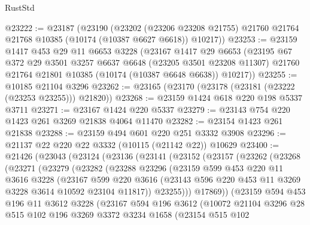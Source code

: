\begin{lexlean}{RustStd}
\begin{coremodule}
@23222 := @23187
    (@23190
      (@23202
        (@23206 @23208 @21755)
        @21760
        @21764
        @21768
        @10385
        (@10174 (@10387 @6627 @6618))
        @10217))
@23253 := @23159
    @1417
    @453
    @29
    @11
    @6653
    @3228
    (@23167
      @1417
      @29
      @6653
      (@23195
        @67
        @372
        @29
        @3501
        @3257
        @6637
        @6648
        (@23205 @3501 @23208 @11307)
        @21760
        @21764
        @21801
        @10385
        (@10174 (@10387 @6648 @6638))
        @10217))
@23255 := @10185 @21104 @3296
@23262 := @23165 (@23170 (@23178 (@23181 (@23222 (@23253 @23255))) @21820))
@23268 := @23159 @1424 @618 @220 @198 @5337 @3711
@23271 := @23167 @1424 @220 @5337
@23279 := @23143 @754 @220 @1423 @261 @3269 @21838 @4064 @11470
@23282 := @23154 @1423 @261 @21838
@23288 := @23159 @494 @601 @220 @251 @3332 @3908
@23296 := @21137 @22 @220 @22 @3332 (@10115 (@21142 @22)) @10629
@23400 := @21426
    (@23043
      (@23124
        (@23136
          (@23141
            (@23152
              (@23157
                (@23262
                  (@23268
                    (@23271
                      (@23279
                        (@23282
                          (@23288
                            @23296
                            (@23159
                              @599
                              @453
                              @220
                              @11
                              @3616
                              @3228
                              (@23167
                                @599
                                @220
                                @3616
                                (@23143 @596 @220 @453 @11 @3269 @3228 @3614 @10592 @23104 @11817))
                              @23255)))
                        @17869))
                    (@23159
                      @594
                      @453
                      @196
                      @11
                      @3612
                      @3228
                      (@23167
                        @594
                        @196
                        @3612
                        (@10072
                          @21104
                          @3296
                          @28
                          @515
                          @102
                          @196
                          @3269
                          @3372
                          @3234
                          @1658
                          (@23154
                            @515
                            @102

\end{coremodule}
\end{lexlean}
